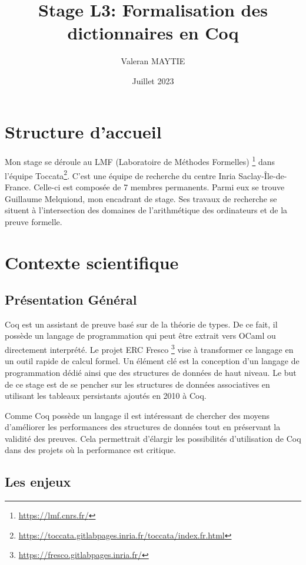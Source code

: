 \documentclass{article}
\title{Stage L3: Formalisation des dictionnaires en Coq}
\author{Valeran MAYTIE}
\date{Juillet 2023}
\begin{document}
  \maketitle

  \section{Structure d'accueil}

  Mon stage se déroule au LMF (Laboratoire de Méthodes Formelles)
\footnote{\url{https://lmf.cnrs.fr/}} dans l'équipe Toccata\footnote{
\url{https://toccata.gitlabpages.inria.fr/toccata/index.fr.html}}. C'est une
équipe de recherche du centre Inria Saclay-Île-de-France. Celle-ci est composée
de 7 membres permanents. Parmi eux se trouve Guillaume Melquiond, mon encadrant
de stage. Ses travaux de recherche se situent à l'intersection des domaines de
l'arithmétique des ordinateurs et de la preuve formelle.

  \section{Contexte scientifique}

    \subsection{Présentation Général}

  Coq est un assistant de preuve basé sur de la théorie de types. De ce fait, il
possède un langage de programmation qui peut être extrait vers OCaml ou
directement interprété. Le projet ERC Fresco
\footnote{\url{https://fresco.gitlabpages.inria.fr/}} vise à transformer
ce langage en un outil rapide de calcul formel. Un élément clé est la conception
d'un langage de programmation dédié ainsi que des structures de données de haut
niveau. Le but de ce stage est de se pencher sur les structures de données
associatives en utilisant les tableaux persistants ajoutés en 2010 à Coq.

  Comme Coq possède un langage il est intéressant de chercher des moyens
d'améliorer les performances des structures de données tout en préservant la
validité des preuves. Cela permettrait d'élargir les possibilités d'utilisation
de Coq dans des projets où la performance est critique.

    \subsection{Les enjeux}
\end{document}
